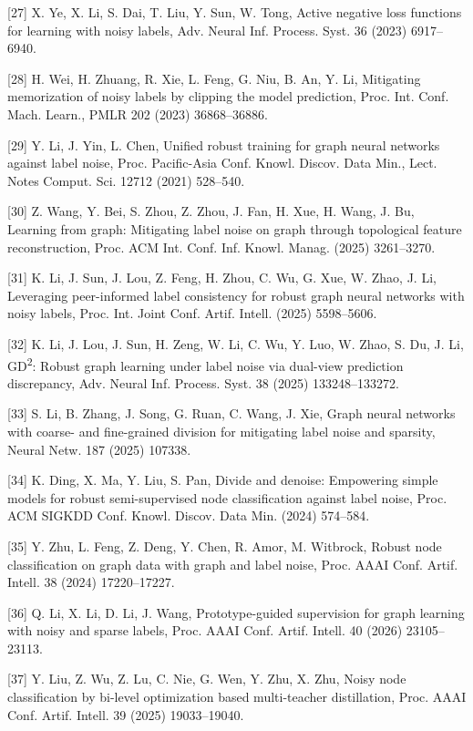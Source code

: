 {[}27{]} X. Ye, X. Li, S. Dai, T. Liu, Y. Sun, W. Tong, Active negative loss functions for learning with noisy labels, Adv. Neural Inf. Process. Syst. 36 (2023) 6917--6940.

{[}28{]} H. Wei, H. Zhuang, R. Xie, L. Feng, G. Niu, B. An, Y. Li, Mitigating memorization of noisy labels by clipping the model prediction, Proc. Int. Conf. Mach. Learn., PMLR 202 (2023) 36868--36886.

{[}29{]} Y. Li, J. Yin, L. Chen, Unified robust training for graph neural networks against label noise, Proc. Pacific-Asia Conf. Knowl. Discov. Data Min., Lect. Notes Comput. Sci. 12712 (2021) 528--540.

{[}30{]} Z. Wang, Y. Bei, S. Zhou, Z. Zhou, J. Fan, H. Xue, H. Wang, J. Bu, Learning from graph: Mitigating label noise on graph through topological feature reconstruction, Proc. ACM Int. Conf. Inf. Knowl. Manag. (2025) 3261--3270.

{[}31{]} K. Li, J. Sun, J. Lou, Z. Feng, H. Zhou, C. Wu, G. Xue, W. Zhao, J. Li, Leveraging peer-informed label consistency for robust graph neural networks with noisy labels, Proc. Int. Joint Conf. Artif. Intell. (2025) 5598--5606.

{[}32{]} K. Li, J. Lou, J. Sun, H. Zeng, W. Li, C. Wu, Y. Luo, W. Zhao, S. Du, J. Li, GD\textsuperscript{2}: Robust graph learning under label noise via dual-view prediction discrepancy, Adv. Neural Inf. Process. Syst. 38 (2025) 133248--133272.

{[}33{]} S. Li, B. Zhang, J. Song, G. Ruan, C. Wang, J. Xie, Graph neural networks with coarse- and fine-grained division for mitigating label noise and sparsity, Neural Netw. 187 (2025) 107338.

{[}34{]} K. Ding, X. Ma, Y. Liu, S. Pan, Divide and denoise: Empowering simple models for robust semi-supervised node classification against label noise, Proc. ACM SIGKDD Conf. Knowl. Discov. Data Min. (2024) 574--584.

{[}35{]} Y. Zhu, L. Feng, Z. Deng, Y. Chen, R. Amor, M. Witbrock, Robust node classification on graph data with graph and label noise, Proc. AAAI Conf. Artif. Intell. 38 (2024) 17220--17227.

{[}36{]} Q. Li, X. Li, D. Li, J. Wang, Prototype-guided supervision for graph learning with noisy and sparse labels, Proc. AAAI Conf. Artif. Intell. 40 (2026) 23105--23113.

{[}37{]} Y. Liu, Z. Wu, Z. Lu, C. Nie, G. Wen, Y. Zhu, X. Zhu, Noisy node classification by bi-level optimization based multi-teacher distillation, Proc. AAAI Conf. Artif. Intell. 39 (2025) 19033--19040.

